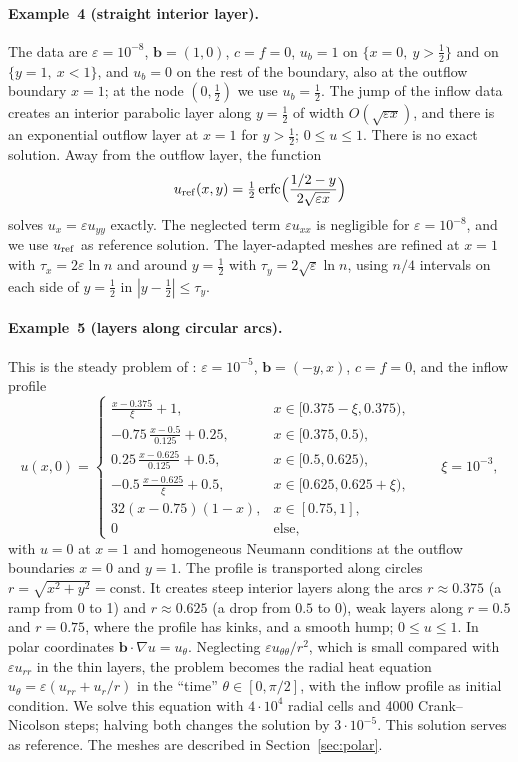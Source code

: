 \documentclass[11pt,a4paper]{article}
\newcommand{\eps}{\varepsilon}
\newcommand{\bb}{\boldsymbol{b}}
\theoremstyle{remark}
\begin{document}
\paragraph{Example~4 (straight interior layer).} The data are $\eps=10^{-8}$, $\bb=(1,0)$, $c=f=0$, $u_b=1$ on
$\{x=0,\ y>\frac12\}$ and on $\{y=1,\ x<1\}$, and $u_b=0$ on the rest of the boundary, also at the outflow boundary
$x=1$; at the node $(0,\frac12)$ we use $u_b=\frac12$. The jump of the inflow data creates an interior parabolic layer
along $y=\frac12$ of width $O(\sqrt{\eps x})$, and there is an exponential outflow layer at $x=1$ for $y>\frac12$;
$0\le u\le1$. There is no exact solution. Away from the outflow layer, the function
\begin{equation*}
  u_{\rm ref}(x,y)=\tfrac12\,\mathrm{erfc}\Bigl(\frac{1/2-y}{2\sqrt{\eps x}}\Bigr)
\end{equation*}
solves $u_x=\eps u_{yy}$ exactly. The neglected term $\eps u_{xx}$ is negligible for $\eps=10^{-8}$, and we use
$u_{\rm ref}$ as reference solution. The layer-adapted meshes are refined at $x=1$ with $\tau_x=2\eps\ln n$ and around
$y=\frac12$ with $\tau_y=2\sqrt\eps\ln n$, using $n/4$ intervals on each side of $y=\frac12$ in
$|y-\frac12|\le\tau_y$.

\paragraph{Example~5 (layers along circular arcs).} This is the steady problem of \cite[Sect.~7]{arXiv2204}:
$\eps=10^{-5}$, $\bb=(-y,x)$, $c=f=0$, and the inflow profile
\begin{equation*}
  u(x,0)=\begin{cases}\frac{x-0.375}{\xi}+1, & x\in[0.375-\xi,0.375),\\[0.5ex]
  -0.75\,\frac{x-0.5}{0.125}+0.25, & x\in[0.375,0.5),\\[0.5ex]
  0.25\,\frac{x-0.625}{0.125}+0.5, & x\in[0.5,0.625),\\[0.5ex]
  -0.5\,\frac{x-0.625}{\xi}+0.5, & x\in[0.625,0.625+\xi),\\[0.5ex]
  32(x-0.75)(1-x), & x\in[0.75,1],\\[0.5ex] 0 & \text{else},\end{cases}\qquad\xi=10^{-3},
\end{equation*}
with $u=0$ at $x=1$ and homogeneous Neumann conditions at the outflow boundaries $x=0$ and $y=1$. The profile is
transported along circles $r=\sqrt{x^2+y^2}=\text{const}$. It creates steep interior layers along the arcs
$r\approx0.375$ (a ramp from 0 to 1) and $r\approx0.625$ (a drop from $0.5$ to 0), weak layers along $r=0.5$ and
$r=0.75$, where the profile has kinks, and a smooth hump; $0\le u\le1$. In polar coordinates
$\bb\cdot\nabla u=u_\theta$. Neglecting $\eps u_{\theta\theta}/r^2$, which is small compared with $\eps u_{rr}$ in the
thin layers, the problem becomes the radial heat equation $u_\theta=\eps(u_{rr}+u_r/r)$ in the ``time''
$\theta\in[0,\pi/2]$, with the inflow profile as initial condition. We solve this equation with $4\cdot10^4$ radial
cells and 4000 Crank--Nicolson steps; halving both changes the solution by $3\cdot10^{-5}$. This solution serves as
reference. The meshes are described in Section~\ref{sec:polar}.
\end{document}
